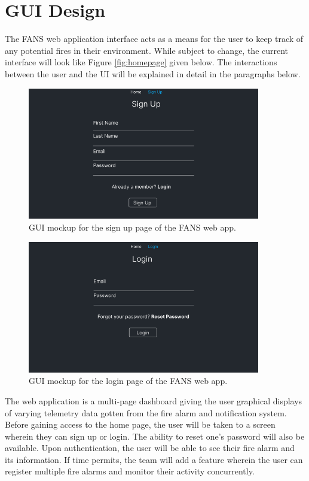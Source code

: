 \section{GUI Design}

The FANS web application interface acts as a means for the user to keep track of any potential fires in their
environment. While subject to change, the current interface will look like Figure \ref{fig:homepage} given below. The
interactions between the user and the UI will be explained in detail in the paragraphs below.

\begin{figure}[H]
    \centering
    \includegraphics[width=4in]{../assets/gui/SignUpPage.png}
    \caption{GUI mockup for the sign up page of the FANS web app.}
    \label{fig:signup}
\end{figure}

\begin{figure}[H]
    \centering
    \includegraphics[width=4in]{../assets/gui/LoginPage.png}
    \caption{GUI mockup for the login page of the FANS web app.}
    \label{fig:login}
\end{figure}

The web application is a multi-page dashboard giving the user graphical displays of varying telemetry data gotten from
the fire alarm and notification system. Before gaining access to the home page, the user will be taken to a screen
wherein they can sign up or login. The ability to reset one's password will also be available. Upon authentication, the
user will be able to see their fire alarm and its information. If time permits, the team will add a feature wherein the
user can register multiple fire alarms and monitor their activity concurrently.

